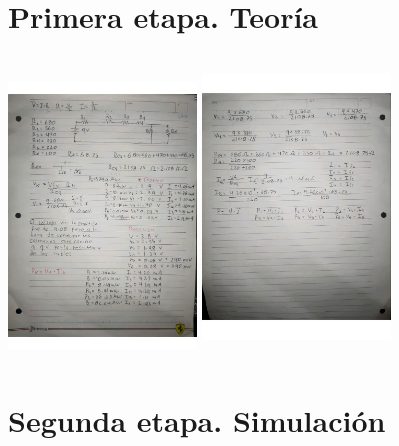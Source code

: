 \documentclass[10pt]{article}
\begin{document}
\begin{multicols}{2}

\section{Primera etapa. Teoría}
\begin{center}
	\includegraphics[width=5cm, height=7.5cm]{Imagenes/notas.jpg}
	\includegraphics[width=5cm, height=8cm]{Imagenes/cal.jpg}
\end{center}
\section{Segunda etapa. Simulación}

\end{multicols}
\end{document}
